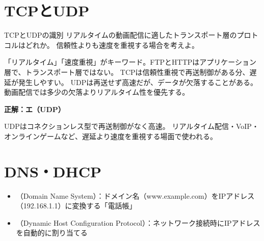 \section{TCPとUDP}

\begin{hikaku}
\end{hikaku}

\begin{reidai}{TCPとUDPの識別}
リアルタイムの動画配信に適したトランスポート層のプロトコルはどれか。
信頼性よりも速度を重視する場合を考えよ。

\end{reidai}

\begin{shishin}
「リアルタイム」「速度重視」がキーワード。FTPとHTTPはアプリケーション層で、トランスポート層ではない。
TCPは信頼性重視で再送制御がある分、遅延が発生しやすい。
UDPは再送せず高速だが、データが欠落することがある。
動画配信では多少の欠落よりリアルタイム性を優先する。
\end{shishin}

\begin{kaitou}
\textbf{正解：エ（UDP）}

UDPはコネクションレス型で再送制御がなく高速。
リアルタイム配信・VoIP・オンラインゲームなど、遅延より速度を重視する場面で使われる。
\end{kaitou}

\section{DNS・DHCP}

\begin{teigi}[DNSとDHCP]
\begin{itemize}
  \item {}（Domain Name System）：ドメイン名（www.example.com）をIPアドレス（192.168.1.1）に変換する「電話帳」
  \item {}（Dynamic Host Configuration Protocol）：ネットワーク接続時にIPアドレスを自動的に割り当てる
\end{itemize}
\end{teigi}

